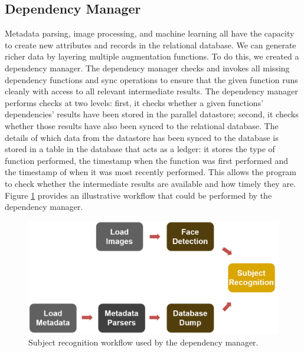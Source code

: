 \documentclass[10pt, a4paper]{article}
\begin{document}
\subsection{Dependency Manager}
\label{subsection:machine_learning:dependency_manager}
Metadata parsing, image processing, and machine learning all have the capacity to create new attributes and records in the relational database. We can generate richer data by layering multiple augmentation functions. To do this, we created a dependency manager. The dependency manager checks and invokes all missing dependency functions and sync operations to ensure that the given function runs cleanly with access to all relevant intermediate results. The dependency manager performs checks at two levels: first, it checks whether a given functions' dependencies' results have been stored in the parallel datastore; second, it checks whether those results have also been synced to the relational database. The details of which data from the datastore has been synced to the database is stored in a table in the database that acts as a ledger: it stores the type of function performed, the timestamp when the function was first performed and the timestamp of when it was most recently performed. This allows the program to check whether the intermediate results are available and how timely they are. Figure \ref{figure:dependency_manager} provides an illustrative workflow that could be performed by the dependency manager.

\begin{figure}[ht]
  \centering
  \includegraphics[width=\columnwidth]{figures/dependency_manager.png}
  \caption{Subject recognition workflow used by the dependency manager.}
  \label{figure:dependency_manager}
\end{figure}
\end{document}
